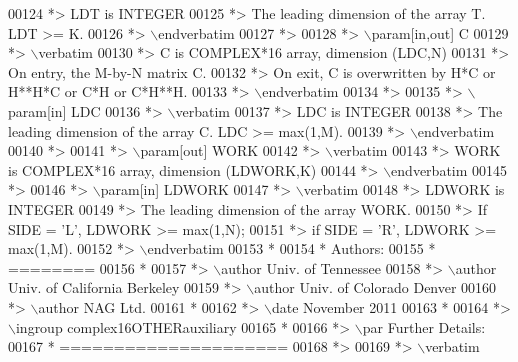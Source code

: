 \begin{DoxyCode}
00124 \textcolor{comment}{*>          LDT is INTEGER}
00125 \textcolor{comment}{*>          The leading dimension of the array T. LDT >= K.}
00126 \textcolor{comment}{*> \(\backslash\)endverbatim}
00127 \textcolor{comment}{*>}
00128 \textcolor{comment}{*> \(\backslash\)param[in,out] C}
00129 \textcolor{comment}{*> \(\backslash\)verbatim}
00130 \textcolor{comment}{*>          C is COMPLEX*16 array, dimension (LDC,N)}
00131 \textcolor{comment}{*>          On entry, the M-by-N matrix C.}
00132 \textcolor{comment}{*>          On exit, C is overwritten by H*C or H**H*C or C*H or C*H**H.}
00133 \textcolor{comment}{*> \(\backslash\)endverbatim}
00134 \textcolor{comment}{*>}
00135 \textcolor{comment}{*> \(\backslash\)param[in] LDC}
00136 \textcolor{comment}{*> \(\backslash\)verbatim}
00137 \textcolor{comment}{*>          LDC is INTEGER}
00138 \textcolor{comment}{*>          The leading dimension of the array C. LDC >= max(1,M).}
00139 \textcolor{comment}{*> \(\backslash\)endverbatim}
00140 \textcolor{comment}{*>}
00141 \textcolor{comment}{*> \(\backslash\)param[out] WORK}
00142 \textcolor{comment}{*> \(\backslash\)verbatim}
00143 \textcolor{comment}{*>          WORK is COMPLEX*16 array, dimension (LDWORK,K)}
00144 \textcolor{comment}{*> \(\backslash\)endverbatim}
00145 \textcolor{comment}{*>}
00146 \textcolor{comment}{*> \(\backslash\)param[in] LDWORK}
00147 \textcolor{comment}{*> \(\backslash\)verbatim}
00148 \textcolor{comment}{*>          LDWORK is INTEGER}
00149 \textcolor{comment}{*>          The leading dimension of the array WORK.}
00150 \textcolor{comment}{*>          If SIDE = 'L', LDWORK >= max(1,N);}
00151 \textcolor{comment}{*>          if SIDE = 'R', LDWORK >= max(1,M).}
00152 \textcolor{comment}{*> \(\backslash\)endverbatim}
00153 \textcolor{comment}{*}
00154 \textcolor{comment}{*  Authors:}
00155 \textcolor{comment}{*  ========}
00156 \textcolor{comment}{*}
00157 \textcolor{comment}{*> \(\backslash\)author Univ. of Tennessee }
00158 \textcolor{comment}{*> \(\backslash\)author Univ. of California Berkeley }
00159 \textcolor{comment}{*> \(\backslash\)author Univ. of Colorado Denver }
00160 \textcolor{comment}{*> \(\backslash\)author NAG Ltd. }
00161 \textcolor{comment}{*}
00162 \textcolor{comment}{*> \(\backslash\)date November 2011}
00163 \textcolor{comment}{*}
00164 \textcolor{comment}{*> \(\backslash\)ingroup complex16OTHERauxiliary}
00165 \textcolor{comment}{*}
00166 \textcolor{comment}{*> \(\backslash\)par Further Details:}
00167 \textcolor{comment}{*  =====================}
00168 \textcolor{comment}{*>}
00169 \textcolor{comment}{*> \(\backslash\)verbatim}

\end{DoxyCode}

